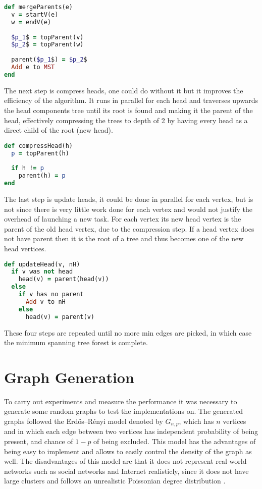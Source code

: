 \documentclass{report}
\theoremstyle{plain}
\theoremstyle{definition}
\theoremstyle{remark}
\begin{document}
\begin{lstlisting}[language=Ruby, mathescape]
def mergeParents(e)
  v = startV(e)
  w = endV(e)
  
  $p_1$ = topParent(v)
  $p_2$ = topParent(w)
   
  parent($p_1$) = $p_2$
  Add e to MST 
end
\end{lstlisting}

The next step is compress heads, one could do without it but it improves the efficiency of the algorithm. It runs in parallel for each head and traverses upwards the head components tree until its root is found and making it the parent of the head, effectively compressing the trees to depth of 2 by having every head as a direct child of the root (new head).

\begin{lstlisting}[language=Ruby]
def compressHead(h)
  p = topParent(h)  
  
  if h != p
    parent(h) = p
end
\end{lstlisting}

The last step is update heads, it could be done in parallel for each vertex, but is not since there is very little work done for each vertex and would not justify the overhead of launching a new task. For each vertex its new head vertex is the parent of the old head vertex, due to the compression step. If a head vertex does not have parent then it is the root of a tree and thus becomes one of the new head vertices.

\begin{lstlisting}[language=Ruby]
def updateHead(v, nH)
  if v was not head
    head(v) = parent(head(v))
  else
    if v has no parent
      Add v to nH
    else
      head(v) = parent(v)
\end{lstlisting}

These four steps are repeated until no more min edges are picked, in which case the minimum spanning tree forest is complete.

\section{Graph Generation}

To carry out experiments and measure the performance it was necessary to generate some random graphs to test the implementations on. The generated graphs followed the Erdős–Rényi model denoted by $G_{n,p}$, which has $n$ vertices and in which each edge between two vertices has independent probability of being present, and chance of $1-p$ of being excluded. This model has the advantages of being easy to implement and allows to easily control the density of the graph as well. The disadvantages of this model are that it does not represent real-world networks such as social networks and Internet realisticly, since it does not have large clusters and follows an unrealistic Poissonian degree distribution \cite{newman20062}.
\end{document}
